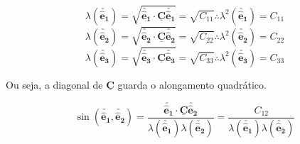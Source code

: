\[\lambda(\utilde{\mathbf{\hat{e}_1}})=\sqrt{\utilde{\mathbf{\hat{e}_1}}\cdot\underline{\mathbf{C}}\utilde{\mathbf{\hat{e}_1}}}=\sqrt{C_{11}}\therefore\lambda^2(\utilde{\mathbf{\hat{e}_1}})=C_{11}\]
\[\lambda(\utilde{\mathbf{\hat{e}_2}})=\sqrt{\utilde{\mathbf{\hat{e}_2}}\cdot\underline{\mathbf{C}}\utilde{\mathbf{\hat{e}_2}}}=\sqrt{C_{22}}\therefore\lambda^2(\utilde{\mathbf{\hat{e}_2}})=C_{22}\]
\[\lambda(\utilde{\mathbf{\hat{e}_3}})=\sqrt{\utilde{\mathbf{\hat{e}_3}}\cdot\underline{\mathbf{C}}\utilde{\mathbf{\hat{e}_3}}}=\sqrt{C_{33}}\therefore\lambda^2(\utilde{\mathbf{\hat{e}_3}})=C_{33}\]

Ou seja, a diagonal de $\underline{\mathbf{C}}$ guarda o alongamento quadrático.

\[\sin(\utilde{\mathbf{\hat{e}_1}},\utilde{\mathbf{\hat{e}_2}})=\frac{\utilde{\mathbf{\hat{e}_1}}\cdot\underline{\mathbf{C}}\utilde{\mathbf{\hat{e}_2}}}{\lambda(\utilde{\mathbf{\hat{e}_1}})\lambda(\utilde{\mathbf{\hat{e}_2}})}=\frac{C_{12}}{\lambda(\utilde{\mathbf{\hat{e}_1}})\lambda(\utilde{\mathbf{\hat{e}_2}})}\]